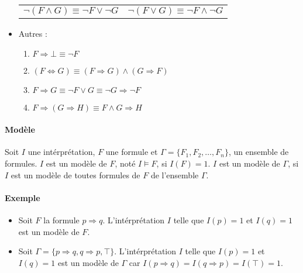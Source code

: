 \documentclass[11pt,twoside,openright,a4paper]{report}
\begin{document}
\begin{itemize}
	\begin{center}

		\begin{tabular}{lr}
			$\neg (F \land G) \equiv \neg F \lor \neg G$ & $\neg (F \lor G) \equiv \neg F \land \neg G$\\
		\end{tabular}
	
	\end{center}

	\item Autres :\\

	\begin{enumerate}
		\item $F \Rightarrow \bot \equiv \neg F$
		\item $(F \Leftrightarrow G) \equiv (F \Rightarrow G) \land (G \Rightarrow F)$
		\item $F \Rightarrow G \equiv \neg F \lor G \equiv \neg G \Rightarrow \neg F$
		\item $F \Rightarrow (G \Rightarrow H) \equiv F \land G \Rightarrow H$
	\end{enumerate}

\end{itemize}


\paragraph{Modèle} %
\label{par:mod_le}

Soit $I$ une intérprétation, $F$ une formule et $\Gamma = \{F_1, F_2, \ldots, F_n\}$, un ensemble de formules. $I$ est un modèle de $F$, noté $I \vDash F$, si $I(F) = 1$. $I$ est un modèle de $\Gamma$, si $I$ est un modèle de toutes formules de $F$ de l'ensemble $\Gamma$.


\paragraph{Exemple} %
\label{par:exemple}

\begin{itemize}
	\item Soit $F$ la formule $p \Rightarrow q$. L'intérprétation $I$ telle que $I(p) = 1$ et $I(q) = 1$ est un modèle de $F$.
	\item Soit $\Gamma = \{p \Rightarrow q, q \Rightarrow p, \top\}$. L'intérprétation $I$ telle que $I(p) = 1$ et $I(q) = 1$ est un modèle de $\Gamma$ car $I(p \Rightarrow q) = I(q \Rightarrow p) = I(\top) = 1$.
\end{itemize}




\end{document}
